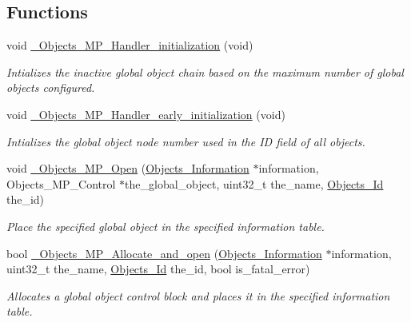 \subsection*{Functions}
\begin{DoxyCompactItemize}
\item 
void \mbox{\hyperlink{group__RTEMSScoreObjectMP_ga1d2257e8720ed52a8f851d768a0facfd}{\+\_\+\+Objects\+\_\+\+M\+P\+\_\+\+Handler\+\_\+initialization}} (void)
\begin{DoxyCompactList}\small\item\em Intializes the inactive global object chain based on the maximum number of global objects configured. \end{DoxyCompactList}\item 
void \mbox{\hyperlink{group__RTEMSScoreObjectMP_ga8eeb67c75c0df3e90a12619b9efa8917}{\+\_\+\+Objects\+\_\+\+M\+P\+\_\+\+Handler\+\_\+early\+\_\+initialization}} (void)
\begin{DoxyCompactList}\small\item\em Intializes the global object node number used in the ID field of all objects. \end{DoxyCompactList}\item 
void \mbox{\hyperlink{group__RTEMSScoreObjectMP_gaa5c13d3459c22165867d079319392ee6}{\+\_\+\+Objects\+\_\+\+M\+P\+\_\+\+Open}} (\mbox{\hyperlink{structObjects__Information}{Objects\+\_\+\+Information}} $\ast$information, Objects\+\_\+\+M\+P\+\_\+\+Control $\ast$the\+\_\+global\+\_\+object, uint32\+\_\+t the\+\_\+name, \mbox{\hyperlink{group__RTEMSScoreObject_ga5821f52a51072941bdd603e542d0863e}{Objects\+\_\+\+Id}} the\+\_\+id)
\begin{DoxyCompactList}\small\item\em Place the specified global object in the specified information table. \end{DoxyCompactList}\item 
bool \mbox{\hyperlink{group__RTEMSScoreObjectMP_gaee5f1bac6bea600e8f437c6cb0458f97}{\+\_\+\+Objects\+\_\+\+M\+P\+\_\+\+Allocate\+\_\+and\+\_\+open}} (\mbox{\hyperlink{structObjects__Information}{Objects\+\_\+\+Information}} $\ast$information, uint32\+\_\+t the\+\_\+name, \mbox{\hyperlink{group__RTEMSScoreObject_ga5821f52a51072941bdd603e542d0863e}{Objects\+\_\+\+Id}} the\+\_\+id, bool is\+\_\+fatal\+\_\+error)
\begin{DoxyCompactList}\small\item\em Allocates a global object control block and places it in the specified information table. \end{DoxyCompactList}\item 

\end{DoxyCompactItemize}
